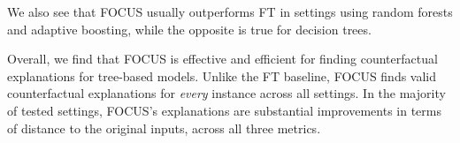 \noindent
We also see that FOCUS usually outperforms FT in settings using random forests and adaptive boosting, while the opposite is true for decision trees. 

Overall, we find that FOCUS is effective and efficient for finding counterfactual explanations for tree-based models.
Unlike the FT baseline, FOCUS finds valid counterfactual explanations for \emph{every} instance across all settings. 
In the majority of tested settings, FOCUS's explanations are substantial improvements in terms of distance to the original inputs, across all three metrics. 






